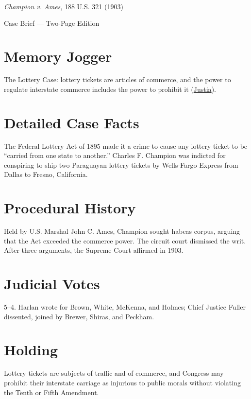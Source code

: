 \documentclass[12pt]{article}
\begin{document}
\begin{center}
{\LARGE \textit{Champion v. Ames}, 188 U.S. 321 (1903)\par}
\vspace{0.5em}
{\large Case Brief --- Two-Page Edition\par}
\end{center}

\section{Memory Jogger}
The Lottery Case: lottery tickets are articles of commerce, and the power to regulate interstate commerce includes the power to prohibit it (\href{https://supreme.justia.com/cases/federal/us/188/321/}{Justia}).

\section{Detailed Case Facts}
The Federal Lottery Act of 1895 made it a crime to cause any lottery ticket to be ``carried from one state to another.'' Charles F. Champion was indicted for conspiring to ship two Paraguayan lottery tickets by Wells-Fargo Express from Dallas to Fresno, California.

\section{Procedural History}
Held by U.S. Marshal John C. Ames, Champion sought habeas corpus, arguing that the Act exceeded the commerce power. The circuit court dismissed the writ. After three arguments, the Supreme Court affirmed in 1903.

\section{Judicial Votes}
5--4. Harlan wrote for Brown, White, McKenna, and Holmes; Chief Justice Fuller dissented, joined by Brewer, Shiras, and Peckham.

\section{Holding}
Lottery tickets are subjects of traffic and of commerce, and Congress may prohibit their interstate carriage as injurious to public morals without violating the Tenth or Fifth Amendment.
\end{document}
